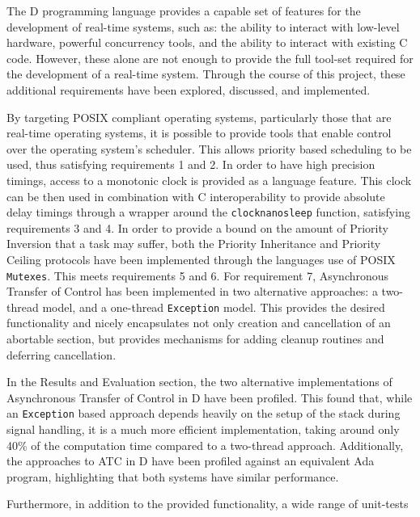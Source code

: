

The D programming language provides a capable set of features for the 
development of real-time systems, such as: the ability to interact with low-level 
hardware, powerful concurrency tools, and the ability to interact with existing C code. 
However, these alone are not enough to provide the full tool-set required for
the development of a real-time system. 
Through the course of this project, these additional requirements have been 
explored, discussed, and implemented.
\par\bigskip\noindent
By targeting POSIX compliant operating systems, particularly those that are
real-time operating systems, it is possible to provide tools that enable control 
over the operating system's scheduler. 
This allows priority based scheduling to be used, thus satisfying requirements
1 and 2.
In order to have high precision timings, access to a monotonic clock is provided 
as a language feature. 
This clock can be then used in combination with C
interoperability to provide absolute delay timings through a wrapper around the
\texttt{clock\textunderscore{}nanosleep} function, satisfying requirements 3 and
4. 
In order to provide a bound on the amount of Priority Inversion that a task
may suffer, both the Priority Inheritance and Priority Ceiling protocols have
been implemented through the languages use of POSIX \texttt{Mutexes}. This meets
requirements 5 and 6. 
For requirement 7, Asynchronous Transfer of Control has been implemented in two 
alternative approaches: a two-thread model, and a one-thread \texttt{Exception} model. 
This provides the desired functionality and 
nicely encapsulates not only creation and cancellation of an
abortable section, but provides mechanisms for adding cleanup routines and deferring 
cancellation. 
\par\bigskip\noindent
In the Results and Evaluation section, the two alternative implementations of
Asynchronous Transfer of Control in D have been profiled. 
This found that, while an \texttt{Exception} based approach depends 
heavily on the setup of the stack during signal handling, it is a much more efficient
implementation, taking around only 40\% of the computation time compared to a
two-thread approach. 
Additionally, the approaches to ATC in D have been profiled against an
equivalent Ada program, highlighting that both systems have similar performance.
\par\bigskip\noindent
Furthermore, in addition to the provided functionality, a wide range of unit-tests 
